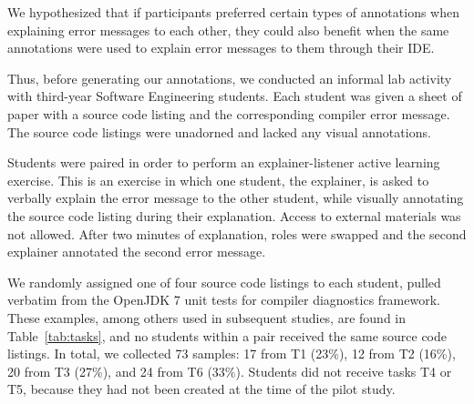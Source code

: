 \documentclass[conference]{IEEEtran}
\begin{document}
We hypothesized that if participants preferred certain types of annotations when explaining error messages to each other, they could also benefit when the same annotations were used to explain error messages to them through their IDE.

Thus, before generating our annotations, we conducted an informal lab activity with third-year Software Engineering students. Each student was given a sheet of paper with a source code listing and the corresponding compiler error message. The source code listings were unadorned and lacked any visual annotations.

Students were paired in order to perform an explainer-listener active learning exercise. This is an exercise in which one student, the explainer, is asked to verbally explain the error message to the other student, while visually annotating the source code listing during their explanation. Access to external materials was not allowed. After two minutes of explanation, roles were swapped and the second explainer annotated the second error message.

We randomly assigned one of four source code listings to each student, pulled verbatim from the OpenJDK 7 unit tests for compiler diagnostics framework. These examples, among others used in subsequent studies, are found in Table~\ref{tab:tasks}, and no students within a pair received the same source code listings. In total, we collected 73 samples:  17 from T1 (23\%), 12 from T2 (16\%), 20 from T3 (27\%), and 24 from T6 (33\%). Students did not receive tasks T4 or T5, because they had not been created at the time of the pilot study.
\end{document}
